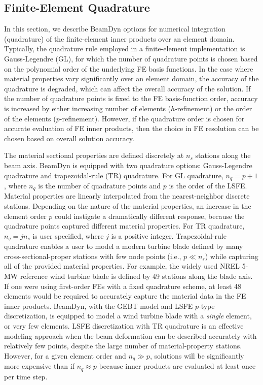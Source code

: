 \documentclass{aiaa-tc}
\begin{document}
\subsection{Finite-Element Quadrature}

In this section, we describe BeamDyn options for numerical integration (quadrature) of the finite-element inner products over an element domain.   
Typically, the quadrature rule employed in a finite-element implementation is Gauss-Legendre (GL), for which the number of quadrature points is chosen based on the polynomial order of the underlying FE basis functions.  
In the case where material properties vary significantly over an element domain, the accuracy of the quadrature is degraded, which can affect the overall accuracy of the solution.   If the number of quadrature points is fixed to the FE basis-function order, accuracy is increased by either increasing number of elements ($h$-refinement) or the order of the elements ($p$-refinement).  However, if the quadrature order is chosen for accurate evaluation of FE inner products, then the choice in FE resolution can be chosen based on overall solution accuracy.

The material sectional properties are defined discretely at $n_s$ stations along the beam axis.
BeamDyn is equipped with two quadrature options: Gauss-Legendre quadrature and trapezoidal-rule (TR) quadrature.  
For GL quadrature, $n_q= p + 1$, where $n_q$ is the number of quadrature points and $p$ is the order of the LSFE.  Material properties are linearly interpolated from the nearest-neighbor discrete stations. 
Depending on the nature of the material properties, an increase in the element order $p$ could instigate a dramatically different response, because the quadrature points captured different material properties.
For TR quadrature, $n_q = j n_s$ is user specified, where $j$ is a positive integer. 
Trapezoidal-rule quadrature enables a user to model a modern turbine blade defined by many cross-sectional-proper stations with few node points (i.e., $p \ll n_s$) while capturing all of the provided material properties.
For example, 
the widely used NREL 5-MW reference wind turbine blade is defined by 49 stations along the blade axis.   If one were using first-order FEs with a fixed quadrature scheme, at least 48 elements would be required to accurately capture the material data in the FE inner products.
BeamDyn, with the GEBT model and LSFE $p$-type discretization, is equipped to model a wind turbine blade with a \textit{single} element, or very few elements.  
LSFE discretization with TR quadrature 
is an effective modeling approach when the beam deformation can be described accurately with relatively few points, despite the large number of material-property stations.    However, for a given element order and $n_q \gg p$, solutions will be significantly more expensive than if $n_q \approx p$ because inner products are evaluated at least once per time step. 
\end{document}
